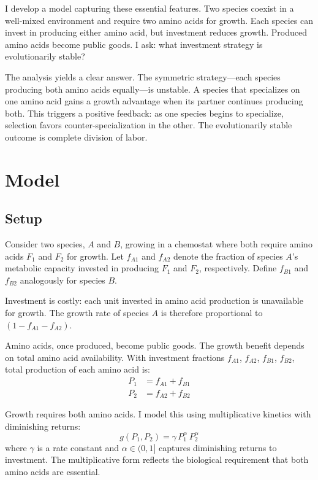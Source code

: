 \documentclass[11pt]{article}
\begin{document}
I develop a model capturing these essential features. Two species coexist in a well-mixed environment and require two amino acids for growth. Each species can invest in producing either amino acid, but investment reduces growth. Produced amino acids become public goods. I ask: what investment strategy is evolutionarily stable?

The analysis yields a clear answer. The symmetric strategy---each species producing both amino acids equally---is unstable. A species that specializes on one amino acid gains a growth advantage when its partner continues producing both. This triggers a positive feedback: as one species begins to specialize, selection favors counter-specialization in the other. The evolutionarily stable outcome is complete division of labor.

\section{Model}

\subsection{Setup}

Consider two species, $A$ and $B$, growing in a chemostat where both require amino acids $F_1$ and $F_2$ for growth. Let $f_{A1}$ and $f_{A2}$ denote the fraction of species $A$'s metabolic capacity invested in producing $F_1$ and $F_2$, respectively. Define $f_{B1}$ and $f_{B2}$ analogously for species $B$.

Investment is costly: each unit invested in amino acid production is unavailable for growth. The growth rate of species $A$ is therefore proportional to $(1 - f_{A1} - f_{A2})$.

Amino acids, once produced, become public goods. The growth benefit depends on total amino acid availability. With investment fractions $f_{A1}$, $f_{A2}$, $f_{B1}$, $f_{B2}$, total production of each amino acid is:
\begin{align}
P_1 &= f_{A1} + f_{B1} \\
P_2 &= f_{A2} + f_{B2}
\end{align}

Growth requires both amino acids. I model this using multiplicative kinetics with diminishing returns:
\begin{equation}
g(P_1, P_2) = \gamma \, P_1^{\alpha} \, P_2^{\alpha}
\end{equation}
where $\gamma$ is a rate constant and $\alpha \in (0,1]$ captures diminishing returns to investment. The multiplicative form reflects the biological requirement that both amino acids are essential.
\end{document}
